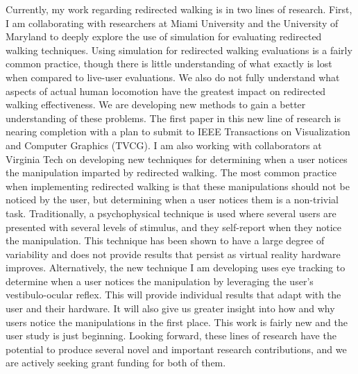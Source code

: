 Currently, my work regarding redirected walking is in two lines of research. First, I am collaborating with researchers at Miami University and the University of Maryland to deeply explore the use of simulation for evaluating redirected walking techniques. Using simulation for redirected walking evaluations is a fairly common practice, though there is little understanding of what exactly is lost when compared to live-user evaluations. We also do not fully understand what aspects of actual human locomotion have the greatest impact on redirected walking effectiveness. We are developing new methods to gain a better understanding of these problems. The first paper in this new line of research is nearing completion with a plan to submit to IEEE Transactions on Visualization and Computer Graphics (TVCG). I am also working with collaborators at Virginia Tech on developing new techniques for determining when a user notices the manipulation imparted by redirected walking. The most common practice when implementing redirected walking is that these manipulations should not be noticed by the user, but determining when a user notices them is a non-trivial task. Traditionally, a psychophysical technique is used where several users are presented with several levels of stimulus, and they self-report when they notice the manipulation. This technique has been shown to have a large degree of variability and does not provide results that persist as virtual reality hardware improves. Alternatively, the new technique I am developing uses eye tracking to determine when a user notices the manipulation by leveraging the user's vestibulo-ocular reflex. This will provide individual results that adapt with the user and their hardware. It will also give us greater insight into how and why users notice the manipulations in the first place. This work is fairly new and the user study is just beginning. Looking forward, these lines of research have the potential to produce several novel and important research contributions, and we are actively seeking grant funding for both of them.


